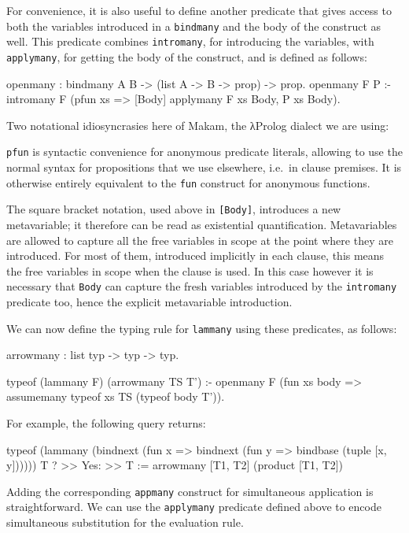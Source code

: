 \documentclass[format=acmlarge,review,anonymous]{acmart}\settopmatter{printfolios=true}
\begin{document}
For convenience, it is also useful to define another predicate that
gives access to both the variables introduced in a \texttt{bindmany} and
the body of the construct as well. This predicate combines
\texttt{intromany}, for introducing the variables, with
\texttt{applymany}, for getting the body of the construct, and is
defined as follows:

\begin{codequote}
openmany : bindmany A B -> (list A -> B -> prop) -> prop.
openmany F P :-
  intromany F (pfun xs => [Body] applymany F xs Body, P xs Body).
\end{codequote}

Two notational idiosyncrasies here of Makam, the λProlog dialect we are
using:

\texttt{pfun} is syntactic convenience for anonymous predicate literals,
allowing to use the normal syntax for propositions that we use
elsewhere, i.e.~in clause premises. It is otherwise entirely equivalent
to the \texttt{fun} construct for anonymous functions.

The square bracket notation, used above in \texttt{{[}Body{]}},
introduces a new metavariable; it therefore can be read as existential
quantification. Metavariables are allowed to capture all the free
variables in scope at the point where they are introduced. For most of
them, introduced implicitly in each clause, this means the free
variables in scope when the clause is used. In this case however it is
necessary that \texttt{Body} can capture the fresh variables introduced
by the \texttt{intromany} predicate too, hence the explicit metavariable
introduction.

We can now define the typing rule for \texttt{lammany} using these
predicates, as follows:

\begin{codequote}
arrowmany : list typ -> typ -> typ.

typeof (lammany F) (arrowmany TS T') :-
  openmany F (fun xs body =>
    assumemany typeof xs TS (typeof body T')).
\end{codequote}

For example, the following query returns:

\begin{codequote}
typeof (lammany (bindnext (fun x => bindnext (fun y => bindbase (tuple [x, y]))))) T ?
>> Yes:
>> T := arrowmany [T1, T2] (product [T1, T2])
\end{codequote}

Adding the corresponding \texttt{appmany} construct for simultaneous
application is straightforward. We can use the \texttt{applymany}
predicate defined above to encode simultaneous substitution for the
evaluation rule.
\end{document}
